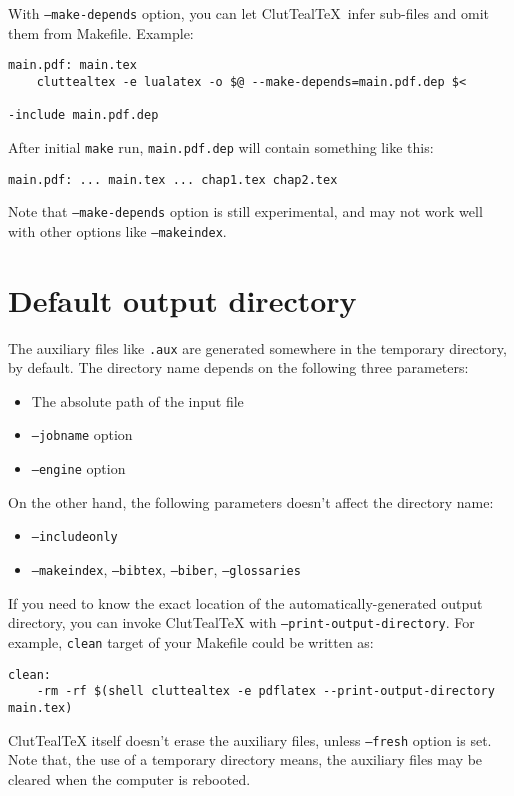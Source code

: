\documentclass[a4paper]{report}
\newcommand\CluttealTeX{ClutTeal\TeX\xspace}
\begin{document}
With \texttt{--make-depends} option, you can let \CluttealTeX\ infer sub-files and omit them from Makefile.
Example:

\begin{verbatim}
main.pdf: main.tex
    cluttealtex -e lualatex -o $@ --make-depends=main.pdf.dep $<

-include main.pdf.dep
\end{verbatim}

After initial \texttt{make} run, \texttt{main.pdf.dep} will contain something like this:
\begin{verbatim}
main.pdf: ... main.tex ... chap1.tex chap2.tex
\end{verbatim}

Note that \texttt{--make-depends} option is still experimental, and may not work well with other options like \texttt{--makeindex}.

\section{Default output directory}
The auxiliary files like \texttt{.aux} are generated somewhere in the temporary directory, by default.
The directory name depends on the following three parameters:
\begin{itemize}
\item The absolute path of the input file
\item \texttt{--jobname} option
\item \texttt{--engine} option
\end{itemize}
On the other hand, the following parameters doesn't affect the directory name:
\begin{itemize}
\item \texttt{--includeonly}
\item \texttt{--makeindex}, \texttt{--bibtex}, \texttt{--biber}, \texttt{--glossaries}
\end{itemize}

If you need to know the exact location of the automatically-generated output directory, you can invoke \CluttealTeX with \texttt{--print-output-directory}.
For example, \texttt{clean} target of your Makefile could be written as:
\begin{verbatim}
clean:
    -rm -rf $(shell cluttealtex -e pdflatex --print-output-directory main.tex)
\end{verbatim}

\CluttealTeX itself doesn't erase the auxiliary files, unless \texttt{--fresh} option is set.
Note that, the use of a temporary directory means, the auxiliary files may be cleared when the computer is rebooted.
\end{document}
